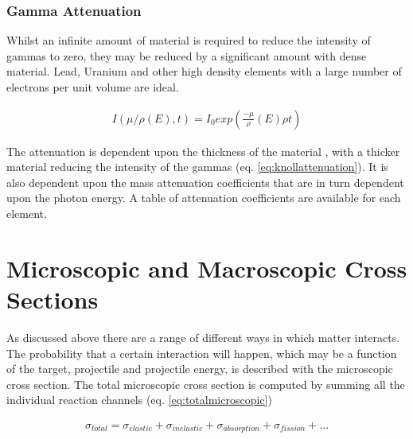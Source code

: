 \subsubsection{Gamma Attenuation}

Whilst an infinite amount of material is required to reduce the intensity of gammas to zero, they may be reduced by a significant amount with dense material.  Lead, Uranium and other high density elements with a large number of electrons per unit volume are ideal.

\begin{equation}
\begin{split}
I(\mu/\rho(E), t) = I_0 exp\left(\frac{-\mu}{\rho}(E) \rho t \right)
\end{split}
\label{eq:knollattenuation}
\end{equation}

The attenuation is dependent upon the thickness of the material , with a thicker material reducing the intensity of the gammas (eq. \ref{eq:knollattenuation}\cite{gknollattenuation}).  It is also dependent upon the mass attenuation coefficients that are in turn dependent upon the photon energy.  A table of attenuation coefficients are available for each element\cite{massattenuation}.



\FloatBarrier






\section{Microscopic and Macroscopic Cross Sections}

As discussed above there are a range of different ways in which matter interacts.  The probability that a certain interaction will happen, which may be a function of the target, projectile and projectile energy, is described with the microscopic cross section.  The total microscopic cross section is computed by summing all the individual reaction channels (eq. \ref{eq:totalmicroscopic})

\begin{equation}
\begin{split}
\sigma_{total} = \sigma_{elastic} + \sigma_{inelastic} + \sigma_{absorption} + \sigma_{fission} + \dots
\end{split}
\label{eq:totalmicroscopic}
\end{equation}

